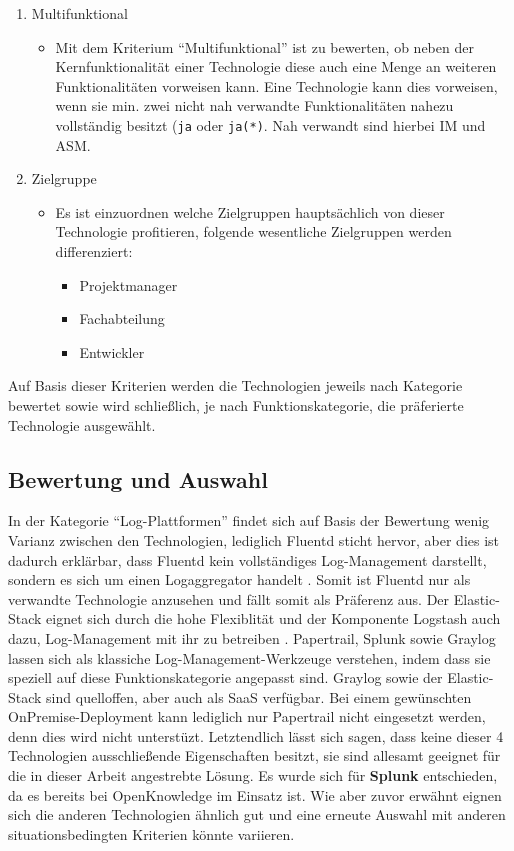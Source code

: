 \begin{enumerate}
	\item Multifunktional
	\begin{itemize}
		\item Mit dem Kriterium \enquote{Multifunktional} ist zu bewerten, ob neben der Kernfunktionalität einer Technologie diese auch eine Menge an weiteren Funktionalitäten vorweisen kann. Eine Technologie kann dies vorweisen, wenn sie min. zwei nicht nah verwandte Funktionalitäten nahezu vollständig besitzt (\texttt{ja} oder \texttt{ja(*)}. Nah verwandt sind hierbei IM und ASM.
	\end{itemize}

	\item Zielgruppe
	\begin{itemize}
		\item Es ist einzuordnen welche Zielgruppen hauptsächlich von dieser Technologie profitieren, folgende wesentliche Zielgruppen werden differenziert:
		\begin{itemize}
			\item Projektmanager
			\item Fachabteilung
			\item Entwickler
		\end{itemize}
	\end{itemize}
\end{enumerate}

Auf Basis dieser Kriterien werden die Technologien jeweils nach Kategorie bewertet sowie wird schließlich, je nach Funktionskategorie, die präferierte Technologie ausgewählt.

\subsection{Bewertung und Auswahl}
\label{subsec:bewertung-und-auswahl}

In der Kategorie \enquote{Log-Plattformen} findet sich auf Basis der Bewertung wenig Varianz zwischen den Technologien, lediglich Fluentd sticht hervor, aber dies ist dadurch erklärbar, dass Fluentd kein vollständiges Log-Management darstellt, sondern es sich um einen Logaggregator handelt \cite{FluentdAggregator}. Somit ist Fluentd nur als verwandte Technologie anzusehen und fällt somit als Präferenz aus. Der Elastic-Stack eignet sich durch die hohe Flexiblität und der Komponente Logstash auch dazu, Log-Management mit ihr zu betreiben  \cite{ThreatIdentificationFromAccessLogsUsingElasticStack} \cite{DesignLogManagementSystem}. Papertrail, Splunk sowie Graylog lassen sich als klassiche Log-Management-Werkzeuge verstehen, indem dass sie speziell auf diese Funktionskategorie angepasst sind. Graylog sowie der Elastic-Stack sind quelloffen, aber auch als SaaS verfügbar. Bei einem gewünschten OnPremise-Deployment kann lediglich nur Papertrail nicht eingesetzt werden, denn dies wird nicht unterstüzt. Letztendlich lässt sich sagen, dass keine dieser 4 Technologien ausschließende Eigenschaften besitzt, sie sind allesamt geeignet für die in dieser Arbeit angestrebte Lösung. Es wurde sich für \textbf{Splunk} entschieden, da es bereits bei OpenKnowledge im Einsatz ist. Wie aber zuvor erwähnt eignen sich die anderen Technologien ähnlich gut und eine erneute Auswahl mit anderen situationsbedingten Kriterien könnte variieren.

